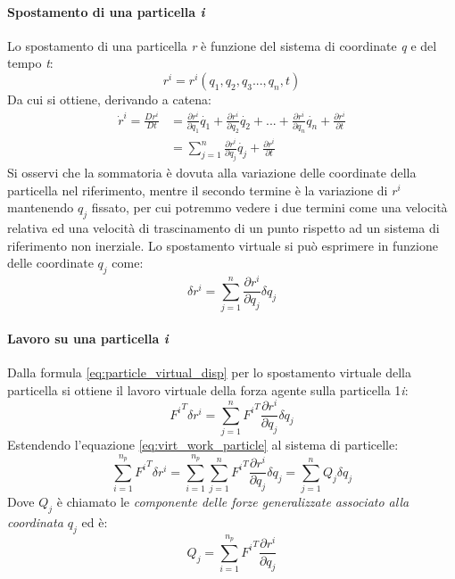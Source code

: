 \paragraph{Spostamento di una particella \emph{i}}
Lo spostamento di una particella \emph{r} è funzione del sistema di coordinate \emph{q} e del tempo \emph{t}:
\begin{equation}
r^i = r^i\left(q_1, q_2, q_3 ... ,q_n, t\right)
\end{equation}
Da cui si ottiene, derivando a catena:
\begin{align}
\label{eq:particle_disp_time_der}
\dot{r}^i = \frac{D r^i}{D t} & = \frac{\partial r^i}{\partial q_1}\dot{q_1} + \frac{\partial r^i}{\partial q_2}\dot{q_2}
+ ... + \frac{\partial r^i}{\partial q_n}\dot{q_n} + \frac{\partial r^i}{\partial t} \nonumber \\
& = \sum_{j=1}^n \frac{\partial r^i}{\partial q_j}\dot{q_j} + \frac{\partial r^i}{\partial t}
\end{align}
Si osservi che la sommatoria è dovuta alla variazione delle coordinate della particella nel riferimento, mentre il secondo termine è la variazione di $r^i$ mantenendo $q_j$ fissato, per cui potremmo vedere i due termini come una velocità relativa ed una velocità di trascinamento di un punto rispetto ad un sistema di riferimento non inerziale. \newline
Lo spostamento virtuale si può esprimere in funzione delle coordinate $q_j$ come:
\begin{equation}
\label{eq:particle_virtual_disp}
\delta r^i = \sum_{j=1}^n\frac{\partial r^i}{\partial q_j}\delta q_j
\end{equation}
\paragraph{Lavoro su una particella \textit{i}}
Dalla formula \ref{eq:particle_virtual_disp} per lo spostamento virtuale della particella si ottiene il lavoro virtuale della forza agente sulla particella 1\emph{i}:
\begin{equation}
\label{eq:virt_work_particle}
{F^i}^T \delta r^i = \sum_{j=1}^n {F^i}^T \frac{\partial r^i}{\partial q_j}\delta q_j
\end{equation}
Estendendo l'equazione \ref{eq:virt_work_particle} al sistema di particelle:
\begin{equation}
\label{eq:virt_work_particlesyst}
\sum_{i=1}^{n_p} {F^i}^T \delta r^i = \sum_{i=1}^{n_p}\sum_{j=1}^n {F^i}^T \frac{\partial r^i}{\partial q_j}\delta q_j = \sum_{j=1}^n Q_j \delta q_j
\end{equation}
Dove $Q_j$ è chiamato le \emph{componente delle forze generalizzate associato alla coordinata $q_j$} ed è:
\begin{equation}
Q_j = \sum_{i=1}^{n_p} {F^i}^T \frac{\partial r^i}{\partial q_j}
\end{equation}
